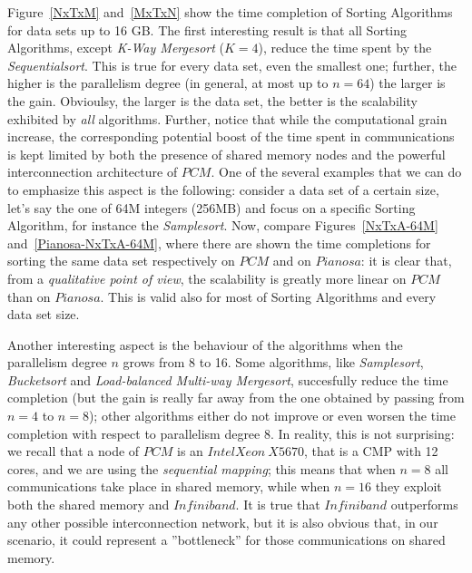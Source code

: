 Figure~\ref{NxTxM} and~\ref{MxTxN} show the time completion of Sorting Algorithms for data sets up to 16 GB. The first interesting result is that all Sorting Algorithms, except \textit{K-Way Mergesort} ($K=4$), reduce the time spent by the \textit{Sequentialsort}. This is true for every data set, even the smallest one; further, the higher is the parallelism degree (in general, at most up to $n=64$) the larger is the gain. Obvioulsy, the larger is the data set, the better is the scalability exhibited by \textit{all} algorithms. Further, notice that while the computational grain increase, the corresponding potential boost of the time spent in communications is kept limited by both the presence of shared memory nodes and the powerful interconnection architecture of $PCM$. One of the several examples that we can do to emphasize this aspect is the following: consider a data set of a certain size, let's say the one of 64M integers (256MB) and focus on a specific Sorting Algorithm, for instance the \textit{Samplesort}. Now, compare Figures~\ref{NxTxA-64M} and~\ref{Pianosa-NxTxA-64M}, where there are shown the time completions for sorting the same data set respectively on $PCM$ and on $Pianosa$: it is clear that, from a \textit{qualitative point of view}, the scalability is greatly more linear on $PCM$ than on $Pianosa$. This is valid also for most of Sorting Algorithms and every data set size. 

Another interesting aspect is the behaviour of the algorithms when the parallelism degree $n$ grows from 8 to 16. Some algorithms, like \textit{Samplesort}, \textit{Bucketsort} and \textit{Load-balanced Multi-way Mergesort}, succesfully reduce the time completion (but the gain is really far away from the one obtained by passing from $n=4$ to $n=8$); other algorithms either do not improve or even worsen the time completion with respect to parallelism degree 8. In reality, this is not surprising: we recall that a node of $PCM$ is an $IntelXeon\ X5670$, that is a CMP with 12 cores, and we are using the \textit{sequential mapping}; this means that when $n=8$ all communications take place in shared memory, while when $n=16$ they exploit both the shared memory and $Infiniband$. It is true that $Infiniband$ outperforms any other possible interconnection network, but it is also obvious that, in our scenario, it could represent a ''bottleneck'' for those communications on shared memory. 




